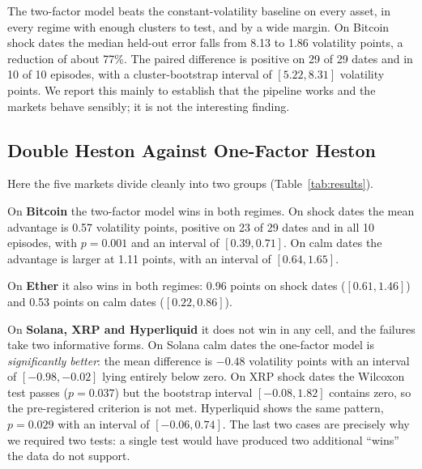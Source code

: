 \documentclass[runningheads]{llncs}
\begin{document}
The two-factor model beats the constant-volatility baseline on every asset, in
every regime with enough clusters to test, and by a wide margin. On Bitcoin
shock dates the median held-out error falls from 8.13 to 1.86 volatility
points, a reduction of about 77\%. The paired difference is positive on 29 of
29 dates and in 10 of 10 episodes, with a cluster-bootstrap interval of
$[5.22, 8.31]$ volatility points. We report this mainly to establish that the
pipeline works and the markets behave sensibly; it is not the interesting
finding.

\subsection{Double Heston Against One-Factor Heston}

Here the five markets divide cleanly into two groups (Table~\ref{tab:results}).

On \textbf{Bitcoin} the two-factor model wins in both regimes. On shock dates
the mean advantage is 0.57 volatility points, positive on 23 of 29 dates and in
all 10 episodes, with $p=0.001$ and an interval of $[0.39,0.71]$. On calm dates
the advantage is larger at 1.11 points, with an interval of $[0.64,1.65]$.

On \textbf{Ether} it also wins in both regimes: 0.96 points on shock dates
($[0.61,1.46]$) and 0.53 points on calm dates ($[0.22,0.86]$).

On \textbf{Solana, XRP and Hyperliquid} it does not win in any cell, and the
failures take two informative forms. On Solana calm dates the one-factor
model is \emph{significantly better}: the mean difference is $-0.48$ volatility
points with an interval of $[-0.98,-0.02]$ lying entirely below zero. On XRP
shock dates the Wilcoxon test passes ($p=0.037$) but the bootstrap interval
$[-0.08,1.82]$ contains zero, so the pre-registered criterion is not met.
Hyperliquid shows the same pattern, $p=0.029$ with an interval of
$[-0.06,0.74]$. The last two cases are precisely why we required two tests: a
single test would have produced two additional ``wins'' the data do not
support.
\end{document}
